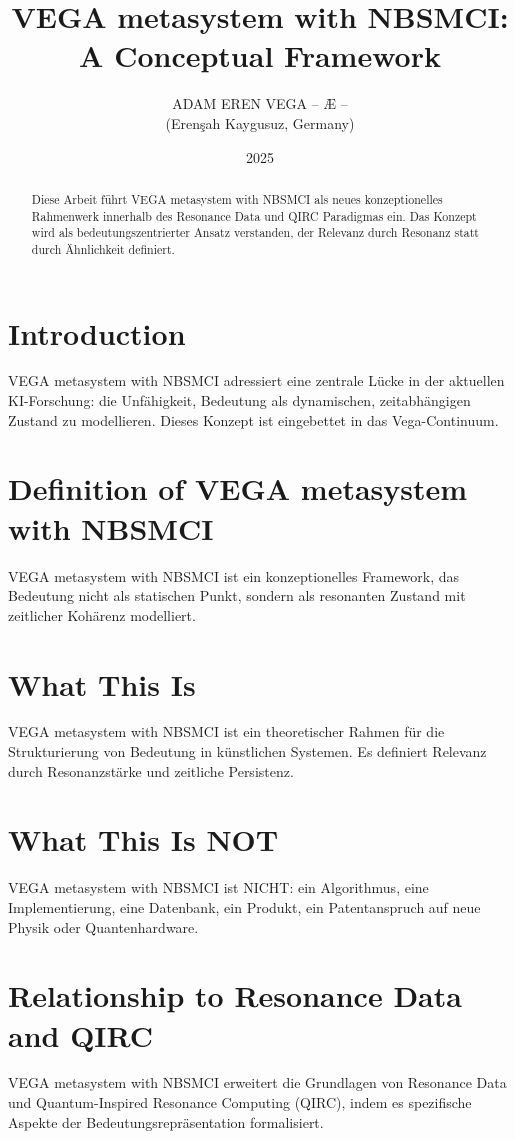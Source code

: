 \documentclass[12pt,a4paper]{article}
\title{VEGA metasystem with NBSMCI: A Conceptual Framework}
\author{ADAM EREN VEGA – Æ – \\ (Erenşah Kaygusuz, Germany)}
\date{2025}
\begin{document}
\maketitle

\begin{abstract}
Diese Arbeit führt VEGA metasystem with NBSMCI als neues konzeptionelles Rahmenwerk innerhalb des Resonance Data und QIRC Paradigmas ein. Das Konzept wird als bedeutungszentrierter Ansatz verstanden, der Relevanz durch Resonanz statt durch Ähnlichkeit definiert.
\end{abstract}

\section{Introduction}
VEGA metasystem with NBSMCI adressiert eine zentrale Lücke in der aktuellen KI-Forschung: die Unfähigkeit, Bedeutung als dynamischen, zeitabhängigen Zustand zu modellieren. Dieses Konzept ist eingebettet in das Vega-Continuum.

\section{Definition of VEGA metasystem with NBSMCI}
VEGA metasystem with NBSMCI ist ein konzeptionelles Framework, das Bedeutung nicht als statischen Punkt, sondern als resonanten Zustand mit zeitlicher Kohärenz modelliert.

\section{What This Is}
VEGA metasystem with NBSMCI ist ein theoretischer Rahmen für die Strukturierung von Bedeutung in künstlichen Systemen. Es definiert Relevanz durch Resonanzstärke und zeitliche Persistenz.

\section{What This Is NOT}
VEGA metasystem with NBSMCI ist NICHT: ein Algorithmus, eine Implementierung, eine Datenbank, ein Produkt, ein Patentanspruch auf neue Physik oder Quantenhardware.

\section{Relationship to Resonance Data and QIRC}
VEGA metasystem with NBSMCI erweitert die Grundlagen von Resonance Data und Quantum-Inspired Resonance Computing (QIRC), indem es spezifische Aspekte der Bedeutungsrepräsentation formalisiert.
\end{document}
